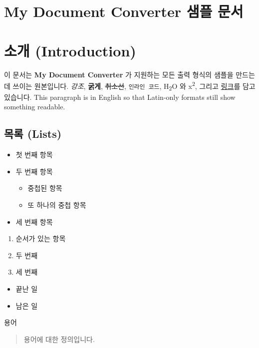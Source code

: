 \documentclass[11pt]{article}
\date{}
\begin{document}
\section*{My Document Converter 샘플 문서}\label{my-document-converter-샘플-문서}

\section*{소개 (Introduction)}\label{소개-introduction}

이 문서는 \textbf{My Document Converter} 가 지원하는 모든 출력 형식의 샘플을 만드는 데 쓰이는
원본입니다. \emph{강조}, \textbf{굵게}, \sout{취소선}, \verb|인라인 코드|,
H\textsubscript{2}O 와 x\textsuperscript{2}, 그리고
\href{https://example.com}{링크}를 담고 있습니다. This paragraph is in English so
that Latin-only formats still show something readable.

\subsection*{목록 (Lists)}\label{목록-lists}

\begin{itemize}
\item 첫 번째 항목
\item 두 번째 항목
\begin{itemize}
\item 중첩된 항목
\item 또 하나의 중첩 항목
\end{itemize}
\item 세 번째 항목
\end{itemize}

\begin{enumerate}
\item 순서가 있는 항목
\item 두 번째
\item 세 번째
\end{enumerate}

\begin{itemize}
\item 끝난 일
\item 남은 일
\end{itemize}

\begin{description}
\item[용어] 
\end{description}

\begin{quote}
용어에 대한 정의입니다.
\end{quote}
\end{document}
